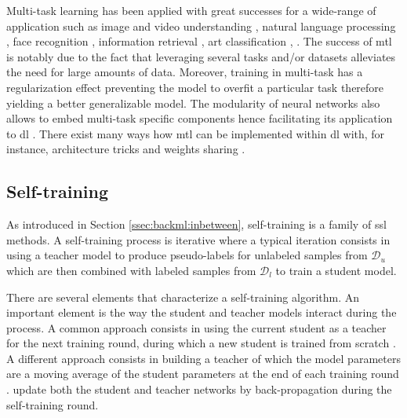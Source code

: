 Multi-task learning \cite{zhang2017survey} has been applied with great successes for a wide-range of application such as image and video understanding \cite{kokkinos2017ubernet}, natural language processing \cite{collobert2008unified}, face recognition \cite{zhu2012face, chen2014joint, zhang2014facial, ranjan2017hyperface}, information retrieval \cite{liu2015representation}, art classification \cite{strezoski2017omniart}, \etc. The success of \acrlong{mtl} is notably due to the fact that leveraging several tasks and/or datasets alleviates the need for large amounts of data. Moreover, training in multi-task has a regularization effect preventing the model to overfit a particular task therefore yielding a better generalizable model. The modularity of neural networks also allows to embed multi-task specific components hence facilitating its application to \acrlong{dl} \cite{caruana1997multitask, zhang2017survey}. There exist many ways how \acrlong{mtl} can be implemented within \acrlong{dl} with, for instance, architecture tricks \cite{misra2016cross, strezoski2019many} and weights sharing \cite{caruana1997multitask}.

\subsection{Self-training}
\label{ssec:backml:dl:selftraining}

As introduced in Section \ref{ssec:backml:inbetween}, self-training is a family of \acrlong{ssl} methods. A self-training process is iterative where a typical iteration consists in using a teacher model to produce pseudo-labels for unlabeled samples from $\mathcal{D}_u$ which are then combined with labeled samples from $\mathcal{D}_l$ to train a student model. 

There are several elements that characterize a self-training algorithm. An important element is the way the student and teacher models interact during the process. A common approach consists in using the current student as a teacher for the next training round, during which a new student is trained from scratch \cite{yarowsky1995unsupervised, xie2020self}. A different approach consists in building a teacher of which the model parameters are a moving average of the student parameters at the end of each training round \cite{tarvainen2017mean}. \citeauthor{pham2021meta} \cite{pham2021meta} update both the student and teacher networks by back-propagation during the self-training round. 

